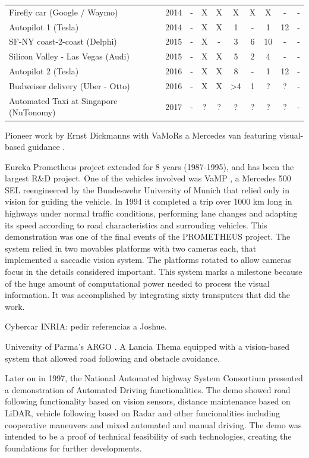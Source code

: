 \begin{table}[H]
\begin{tabularx}{\linewidth}{L r c c c c c c c c}
        Firefly car (Google / Waymo)                  & 2014  & - & X & X &  X &  X &  X &  - & - \\
        Autopilot 1   (Tesla)                         & 2014  & - & X & X &  1 &  - &  1 & 12 & - \\
        SF-NY coast-2-coast (Delphi)                  & 2015  & - & X & - &  3 &  6 & 10 &  - & - \\
        Silicon Valley - Las Vegas (Audi)             & 2015  & - & X & X &  5 &  2 &  4 &  - & - \\   
        Autopilot 2 (Tesla)                           & 2016  & - & X & X &  8 &  - &  1 & 12 & - \\  
        Budweiser delivery (Uber - Otto)              & 2016  & - & X & X & >4 &  1 &  ? &  ? & - \\
        Automated Taxi at Singapore (NuTonomy)        & 2017  & - & ? & ? &  ? &  ? &  ? &  ? & - \\    
    \end{tabularx}
\end{table}

Pioneer work by Ernst Dickmanns with VaMoRs a Mercedes van featuring 
visual-based guidance \cite{Dickmanns1987}.

Eureka Prometheus project extended for 8 years (1987-1995), and has been the 
largest R\&D project. One of the vehicles involved was VaMP \cite{Gregor2002}, 
a Mercedes 500 SEL reengineered by the Bundeswehr University of Munich that
relied only in vision for guiding the vehicle. In 1994 it completed a trip over 
1000 km long in highways under normal traffic conditions, performing lane 
changes and adapting its speed according to road characteristics and surrouding 
vehicles.
This demonstration was one of the final events of the PROMETHEUS project.
The system relied in two movables platforms with two cameras each, that 
implemented a saccadic vision system. The platforms rotated 
to allow cameras focus in the details considered important.
This system marks a milestone because of the huge amount of computational power 
needed to process the visual information. It was accomplished by integrating
sixty transputers that did the work.

Cybercar INRIA: pedir referencias a Joshue.

University of Parma's ARGO \cite{Broggi1998}. A Lancia Thema equipped with a
vision-based system that allowed road following and obstacle avoidance.

Later on in 1997, the National Automated highway System Consortium presented a 
demonstration of Automated Driving functionalities\cite{Thorpe1997}. 
The demo showed road following functionality based on vision sensors, 
distance maintenance based on LiDAR, vehicle following based on Radar
and other funcionalities including cooperative maneuvers and mixed automated 
and manual driving. 
The demo was intended to be a proof of technical feasibility of such 
technologies, creating the foundations for further developments.

